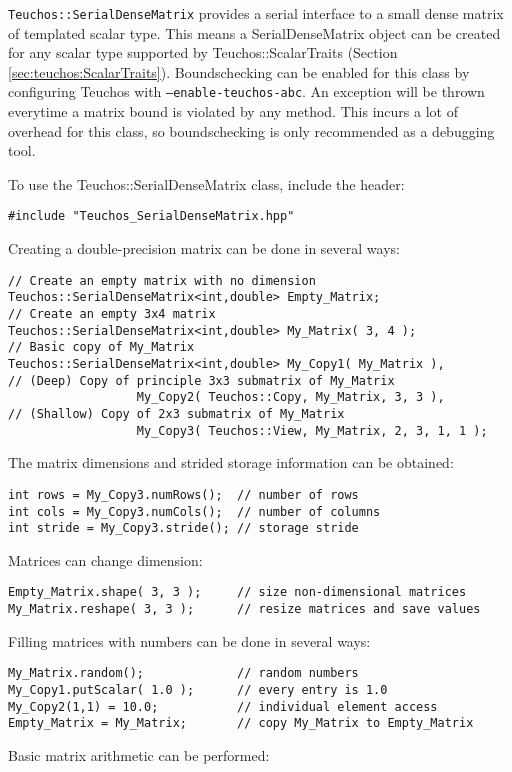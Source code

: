 \verb!Teuchos::SerialDenseMatrix! provides a serial interface to a small dense matrix
of templated scalar type.  This means a SerialDenseMatrix object can be created for any scalar type 
supported by Teuchos::ScalarTraits (Section \ref{sec:teuchos:ScalarTraits}).  Boundschecking
can be enabled for this class by configuring Teuchos with {\tt --enable-teuchos-abc}.
An exception will be thrown everytime a matrix bound is violated by any method.  This 
incurs a lot of overhead for this class, so boundschecking is only recommended as a debugging tool.

To use the Teuchos::SerialDenseMatrix class, include the header:

{\small 
\begin{verbatim}
#include "Teuchos_SerialDenseMatrix.hpp"
\end{verbatim}}
Creating a double-precision matrix can be done in several ways:
{\small 
\begin{verbatim}
// Create an empty matrix with no dimension
Teuchos::SerialDenseMatrix<int,double> Empty_Matrix;
// Create an empty 3x4 matrix
Teuchos::SerialDenseMatrix<int,double> My_Matrix( 3, 4 );
// Basic copy of My_Matrix
Teuchos::SerialDenseMatrix<int,double> My_Copy1( My_Matrix ),
// (Deep) Copy of principle 3x3 submatrix of My_Matrix
                  My_Copy2( Teuchos::Copy, My_Matrix, 3, 3 ),
// (Shallow) Copy of 2x3 submatrix of My_Matrix
                  My_Copy3( Teuchos::View, My_Matrix, 2, 3, 1, 1 );
\end{verbatim}}
The matrix dimensions and strided storage information can be obtained:
{\small
\begin{verbatim}
int rows = My_Copy3.numRows();  // number of rows
int cols = My_Copy3.numCols();  // number of columns
int stride = My_Copy3.stride(); // storage stride
\end{verbatim}}
Matrices can change dimension:
{\small
\begin{verbatim}
Empty_Matrix.shape( 3, 3 );     // size non-dimensional matrices
My_Matrix.reshape( 3, 3 );      // resize matrices and save values
\end{verbatim}}
Filling matrices with numbers can be done in several ways:
{\small 
\begin{verbatim}
My_Matrix.random();             // random numbers
My_Copy1.putScalar( 1.0 );      // every entry is 1.0
My_Copy2(1,1) = 10.0;           // individual element access
Empty_Matrix = My_Matrix;       // copy My_Matrix to Empty_Matrix 
\end{verbatim}}
Basic matrix arithmetic can be performed:
